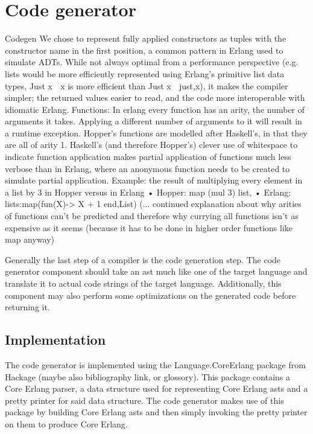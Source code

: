 \section{Code generator}


Codegen 
We chose to represent fully applied constructors as tuples with the constructor name in the first position, a common pattern in Erlang used to simulate ADTs.  While not always optimal from a performance perspective (e.g. lists would be more efficiently represented using Erlang’s primitive list data types, Just x  {x} is more efficient than Just x  {just,x}), it makes the compiler simpler; the returned values easier to read, and the code more interoperable with idiomatic Erlang.
Functions: 
In erlang every function has an arity, the number of arguments it takes. Applying a different number of arguments to it will result in a runtime exception. Hopper’s functions are modelled after Haskell’s, in that they are all of arity 1. Haskell’s (and therefore Hopper’s) clever use of whitespace to indicate function application makes partial application of functions much less verbose than in Erlang, where an anonymous function needs to be created to simulate partial application. 
Example: the result of multiplying every element in a list by 3 in Hopper versus in Erlang
•	Hopper: map (mul 3) list,
•	Erlang:  lists:map(fun(X)-> X + 1 end,List)
(... continued explanation about why arities of functions can't be predicted and therefore why currying all functions isn't as expensive as it seems (because it has to be done in higher order functions like map anyway)

Generally the last step of a compiler is the code generation step. The code generator
component should take an \gls{ast} much like one of the target language and translate it
to actual code strings of the target language. Additionally, this component may also
perform some optimizations on the generated code before returning it.

\subsection{Implementation}

The code generator is implemented using the Language.CoreErlang \cite{CoreErlang} package
from Hackage (maybe also bibliography link, or glossory). This package contains a Core Erlang
parser, a data structure used for representing Core Erlang \gls{ast}s and a pretty printer for
said data structure. The code generator makes use of this package by building Core Erlang
\gls{ast}s and then simply invoking the pretty printer on them to  produce Core Erlang.

